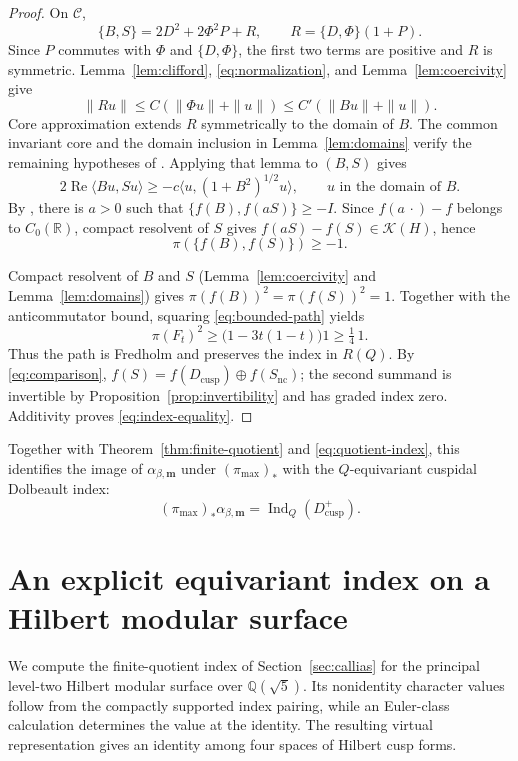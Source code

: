 \documentclass[11pt]{article}
\theoremstyle{definition}
\theoremstyle{plain}
\numberwithin{equation}{section}
\newcommand{\cusp}{\mathrm{cusp}}
\newcommand{\nc}{\mathrm{nc}}
\newcommand{\Ind}{\operatorname{Ind}}
\begin{document}
\begin{proof}
On $\mathcal C$,
\[
 \{B,S\}=2D^2+2\Phi^2P+R,\qquad R=\{D,\Phi\}(1+P).
\]
Since $P$ commutes with $\Phi$ and $\{D,\Phi\}$, the first two
terms are positive and $R$ is symmetric.
Lemma~\ref{lem:clifford}, \eqref{eq:normalization}, and
Lemma~\ref{lem:coercivity} give
\[
 \|Ru\|\leq C(\|\Phi u\|+\|u\|)
          \leq C'(\|Bu\|+\|u\|).
\]
Core approximation extends $R$ symmetrically to the domain of $B$.
The common invariant core and the domain inclusion in
Lemma~\ref{lem:domains} verify the remaining hypotheses of
\cite[Lemma~3.5, pp.~12--13]{vanDenDungen}. Applying that lemma to $(B,S)$ gives
\[
 2\operatorname{Re}\langle Bu,Su\rangle
 \geq-c\langle u,(1+B^2)^{1/2}u\rangle,
 \qquad u\text{ in the domain of }B.
\]
By \cite[Prop.~3.10, pp.~15--16]{vanDenDungen}, there is $a>0$
such that $\{f(B),f(aS)\}\geq-I$.
Since $f(a\,\cdot)-f$ belongs to $C_0(\mathbb R)$, compact resolvent of $S$
gives $f(aS)-f(S)\in\mathcal K(H)$, hence
\[
 \pi(\{f(B),f(S)\})\geq-1.
\]

Compact resolvent of $B$ and $S$
(Lemma~\ref{lem:coercivity} and
Lemma~\ref{lem:domains}) gives $\pi(f(B))^2=\pi(f(S))^2=1$.
Together with the anticommutator bound, squaring
\eqref{eq:bounded-path} yields
\[
 \pi(F_t)^2\geq\bigl(1-3t(1-t)\bigr)1\geq\tfrac14\,1.
\]
Thus the path is Fredholm and preserves the index in $R(Q)$.
By \eqref{eq:comparison},
$f(S)=f(D_{\cusp})\oplus f(S_{\nc})$; the second summand is invertible
by Proposition~\ref{prop:invertibility} and has graded index zero.
Additivity proves \eqref{eq:index-equality}.
\end{proof}

Together with Theorem~\ref{thm:finite-quotient} and
\eqref{eq:quotient-index}, this identifies the image of
$\alpha_{\beta,\boldsymbol m}$ under $(\pi_{\max})_*$
with the $Q$-equivariant cuspidal Dolbeault index:
\begin{equation}\label{eq:higher-cuspidal-index}
 (\pi_{\max})_*\alpha_{\beta,\boldsymbol m}
   =\Ind_Q(D_{\cusp}^+).
\end{equation}
\section{An explicit equivariant index on a Hilbert modular surface}
\label{sec:a5}

We compute the finite-quotient index of Section~\ref{sec:callias}
for the principal level-two Hilbert modular surface over
$\mathbb Q(\sqrt5)$. Its nonidentity character values follow from
the compactly supported index pairing, while an Euler-class
calculation determines the value at the identity. The resulting
virtual representation gives an identity among four spaces of
Hilbert cusp forms.
\end{document}
